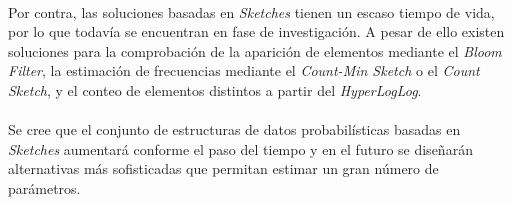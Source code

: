 \documentclass{subfiles}
\begin{document}
      \paragraph{}
      Por contra, las soluciones basadas en \emph{Sketches} tienen un escaso tiempo de vida, por lo que todavía se encuentran en fase de investigación. A pesar de ello existen soluciones para la comprobación de la aparición de elementos mediante el \emph{Bloom Filter}, la estimación de frecuencias mediante el \emph{Count-Min Sketch} o el \emph{Count Sketch}, y el conteo de elementos distintos a partir del \emph{HyperLogLog}.

      \paragraph{}
      Se cree que el conjunto de estructuras de datos probabilísticas basadas en \emph{Sketches} aumentará conforme el paso del tiempo y en el futuro se diseñarán alternativas más sofisticadas que permitan estimar un gran número de parámetros.
\end{document}

